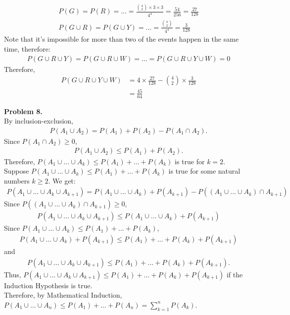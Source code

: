 \documentclass{article}
\begin{document}
\begin{align}
    P(G) = P(R) = \dots = \frac{{4 \choose 2} \times 3 \times 3}{4^4} = \frac{54}{256} = \frac{27}{128}\\
    P(G \cup R) = P(G \cup Y) = \dots = \frac{{4 \choose 2}}{4^4} = \frac{3 }{128}
\end{align}
Note that it's impossible for more than two of the events happen in the same time, therefore:
\begin{align}
    P(G \cup R \cup Y) = P(G \cup R \cup W) = \dots = P(G \cup R \cup Y \cup W) = 0
\end{align}
Therefore,
\begin{align}
    P(G \cup R \cup Y \cup W) & = 4 \times \frac{27}{128} - {4 \choose 2} \times \frac{3}{128} \\
    & = \frac{45}{64}
\end{align}
\bigbreak

\textbf{Problem 8.} \\
By inclusion-exclusion,
\begin{align}
    P(A_1 \cup A_2) = P(A_1) + P(A_2) - P(A_1 \cap A_2).
\end{align}
Since $P(A_1 \cap A_2) \ge 0$,
\begin{align}
    P(A_1 \cup A_2) \le P(A_1) + P(A_2).
\end{align}
Therefore, $P(A_1 \cup \dots \cup A_k) \le P(A_1) + \dots + P(A_k)$ is true for $k = 2$. \\
Suppose $P(A_1 \cup \dots \cup A_k) \le P(A_1) + \dots + P(A_k)$ is true for some natural numbers $k \ge 2$.
We get:
\begin{align}
    P(A_1 \cup \dots \cup A_k \cup A_{k+1}) = P(A_1 \cup \dots \cup A_k) + P(A_{k+1}) - P((A_1 \cup \dots \cup A_k) \cap A_{k+1}) 
\end{align}
Since $P((A_1 \cup \dots \cup A_k) \cap A_{k+1}) \ge 0$, 
\begin{align}
    P(A_1 \cup \dots \cup A_k \cup A_{k+1}) \le P(A_1 \cup \dots \cup A_k) + P(A_{k+1})
\end{align}
Since $P(A_1 \cup \dots \cup A_k) \le P(A_1) + \dots + P(A_k)$,
\begin{align}
    P(A_1 \cup \dots \cup A_k) + P(A_{k+1}) \le P(A_1) + \dots + P(A_k) + P(A_{k+1})
\end{align}
and 
\begin{align}
    P(A_1 \cup \dots \cup A_k \cup A_{k+1}) \le P(A_1) + \dots + P(A_k) + P(A_{k+1}).
\end{align}
Thus, $P(A_1 \cup \dots \cup A_k \cup A_{k+1}) \le P(A_1) + \dots + P(A_k) + P(A_{k+1})$ if the Induction Hypothesis is true. \\
Therefore, by Mathematical Induction, $P(A_1 \cup \dots \cup A_n) \le P(A_1) + \dots + P(A_n) = \sum_{k=1}^{n}P(A_k)$.
\end{document}
